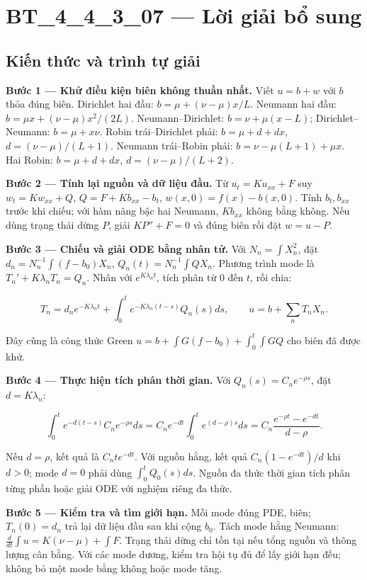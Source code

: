\documentclass[10pt,a4paper]{article}
\begin{document}
\section*{BT\_4\_4\_3\_07 — Lời giải bổ sung}
\subsection*{Kiến thức và trình tự giải}
\textbf{Bước 1 — Khử điều kiện biên không thuần nhất.} Viết $u=b+w$ với $b$ thỏa đúng biên. Dirichlet hai đầu: $b=\mu+(\nu-\mu)x/L$. Neumann hai đầu: $b=\mu x+(\nu-\mu)x^2/(2L)$. Neumann–Dirichlet: $b=\nu+\mu(x-L)$; Dirichlet–Neumann: $b=\mu+x\nu$. Robin trái–Dirichlet phải: $b=\mu+d+dx$, $d=(\nu-\mu)/(L+1)$. Neumann trái–Robin phải: $b=\nu-\mu(L+1)+\mu x$. Hai Robin: $b=\mu+d+dx$, $d=(\nu-\mu)/(L+2)$.

\textbf{Bước 2 — Tính lại nguồn và dữ liệu đầu.} Từ $u_t=Ku_{xx}+F$ suy $w_t=Kw_{xx}+Q$, $Q=F+Kb_{xx}-b_t$, $w(x,0)=f(x)-b(x,0)$. Tính $b_t,b_{xx}$ trước khi chiếu; với hàm nâng bậc hai Neumann, $Kb_{xx}$ không bằng không. Nếu dùng trạng thái dừng $P$, giải $KP''+F=0$ và đúng biên rồi đặt $w=u-P$.

\textbf{Bước 3 — Chiếu và giải ODE bằng nhân tử.} Với $N_n=\int X_n^2$, đặt $d_n=N_n^{-1}\int(f-b_0)X_n$, $Q_n(t)=N_n^{-1}\int QX_n$. Phương trình mode là $T_n'+K\lambda_nT_n=Q_n$. Nhân với $e^{K\lambda_nt}$, tích phân từ $0$ đến $t$, rồi chia:


\[
T_n=d_ne^{-K\lambda_nt}+\int_0^te^{-K\lambda_n(t-s)}Q_n(s)ds,\qquad
u=b+\sum_nT_nX_n.
\]


Đây cũng là công thức Green $u=b+\int G(f-b_0)+\int_0^t\int GQ$ cho biên đã được khử.

\textbf{Bước 4 — Thực hiện tích phân thời gian.} Với $Q_n(s)=C_ne^{-\rho s}$, đặt $d=K\lambda_n$:


\[
\int_0^te^{-d(t-s)}C_ne^{-\rho s}ds
=C_ne^{-dt}\int_0^te^{(d-\rho)s}ds
=C_n\frac{e^{-\rho t}-e^{-dt}}{d-\rho}.
\]


Nếu $d=\rho$, kết quả là $C_nte^{-dt}$. Với nguồn hằng, kết quả $C_n(1-e^{-dt})/d$ khi $d>0$; mode $d=0$ phải dùng $\int_0^tQ_0(s)ds$. Nguồn đa thức thời gian tích phân từng phần hoặc giải ODE với nghiệm riêng đa thức.

\textbf{Bước 5 — Kiểm tra và tìm giới hạn.} Mỗi mode đúng PDE, biên; $T_n(0)=d_n$ trả lại dữ liệu đầu sau khi cộng $b_0$. Tách mode hằng Neumann: $\frac d{dt}\int u=K(\nu-\mu)+\int F$. Trạng thái dừng chỉ tồn tại nếu tổng nguồn và thông lượng cân bằng. Với các mode dương, kiểm tra hội tụ đủ để lấy giới hạn đều; không bỏ một mode bằng không hoặc mode tăng.
\end{document}
